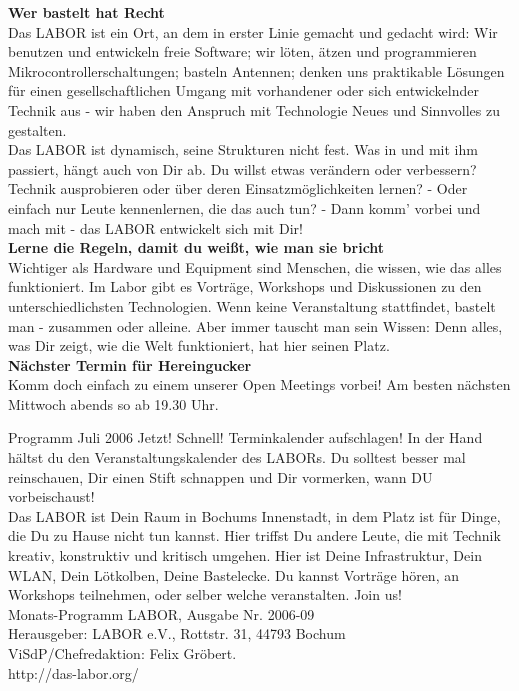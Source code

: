 \documentclass[10pt,landscape]{article}
\begin{document}
\begin{multicols}{3}

{\bf Wer bastelt hat Recht}\\
Das LABOR ist ein Ort, an dem in erster Linie gemacht und gedacht wird: Wir benutzen und entwickeln freie Software; wir l\"oten, \"atzen und programmieren Mikrocontrollerschaltungen; basteln Antennen; denken uns praktikable L\"osungen f\"ur einen gesellschaftlichen Umgang mit vorhandener oder sich entwickelnder Technik aus - wir haben den Anspruch mit Technologie Neues und Sinnvolles zu gestalten.\\
Das LABOR ist dynamisch, seine Strukturen nicht fest. Was in und mit ihm passiert, h\"angt auch von Dir ab. Du willst etwas ver\"andern oder verbessern? Technik ausprobieren oder \"uber deren Einsatzm\"oglichkeiten lernen? - Oder einfach nur Leute kennenlernen, die das auch tun? - Dann komm' vorbei und mach mit - das LABOR entwickelt sich mit Dir!\\
{\bf Lerne die Regeln, damit du weißt, wie man sie bricht}\\
Wichtiger als Hardware und Equipment sind Menschen, die wissen, wie das alles funktioniert. Im Labor gibt es Vortr\"age, Workshops und Diskussionen zu den unterschiedlichsten Technologien. Wenn keine Veranstaltung stattﬁndet, bastelt man - zusammen oder alleine. Aber immer tauscht man sein Wissen: Denn alles, was Dir zeigt, wie die Welt funktioniert, hat hier seinen Platz.\\
\vskip1cm
{\bf N\"achster Termin f\"ur Hereingucker}\\
Komm doch einfach zu einem unserer Open Meetings vorbei! Am besten n\"achsten Mittwoch abends so ab 19.30 Uhr.\\
\vskip1cm

Programm Juli 2006
Jetzt! Schnell! Terminkalender aufschlagen! In der Hand h\"altst du den Veranstaltungskalender des LABORs. Du solltest besser mal reinschauen, Dir einen Stift schnappen und Dir vormerken, wann DU vorbeischaust! \\
Das LABOR ist Dein Raum in Bochums Innenstadt, in dem Platz ist f\"ur Dinge, die Du zu Hause nicht tun kannst. Hier triffst Du andere Leute, die mit Technik kreativ, konstruktiv und kritisch umgehen. Hier ist Deine Infrastruktur, Dein WLAN, Dein L\"otkolben, Deine Bastelecke. Du kannst Vortr\"age h\"oren, an Workshops teilnehmen, oder selber welche veranstalten. Join us! \\

Monats-Programm LABOR, Ausgabe Nr. 2006-09 \\ %
Herausgeber: LABOR e.V., Rottstr. 31, 44793 Bochum \\
ViSdP/Chefredaktion: Felix Gr\"obert.\\
http://das-labor.org/


\end{multicols}
\end{document}
